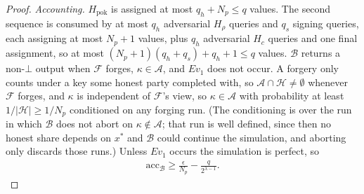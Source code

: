\documentclass{article}
\theoremstyle{plain}
\theoremstyle{definition}
\theoremstyle{remark}
\begin{document}
\begin{proof}
  \emph{Accounting.}  $H_{\mathrm{pok}}$ is assigned at most $q_h + N_p \le q$ values.  The second sequence is consumed by at most $q_h$ adversarial $H_\rho$ queries and $q_s$ signing queries, each assigning at most $N_p + 1$ values, plus $q_h$ adversarial $H_c$ queries and one final assignment, so at most $(N_p + 1)(q_h + q_s) + q_h + 1 \le q$ values.  $\mathcal{B}$ returns a non-$\bot$ output when $\mathcal{F}$ forges, $\kappa \in \mathcal{A}$, and $\mathit{Ev}_1$ does not occur.  A forgery only counts under a key some honest party completed with, so $\mathcal{A} \cap \mathcal{H} \neq \emptyset$ whenever $\mathcal{F}$ forges, and $\kappa$ is independent of $\mathcal{F}$'s view, so $\kappa \in \mathcal{A}$ with probability at least $1/|\mathcal{H}| \ge 1/N_p$ conditioned on any forging run.  (The conditioning is over the run in which $\mathcal{B}$ does not abort on $\kappa \notin \mathcal{A}$; that run is well defined, since then no honest share depends on $x^*$ and $\mathcal{B}$ could continue the simulation, and aborting only discards those runs.)  Unless $\mathit{Ev}_1$ occurs the simulation is perfect, so
  \begin{align}\label{equation:proof-accb}
    \mathrm{acc}_{\mathcal{B}} \ge \frac{\epsilon}{N_p} - \frac{q}{2^{\lambda - 1}}.
  \end{align}


\end{proof}
\end{document}
